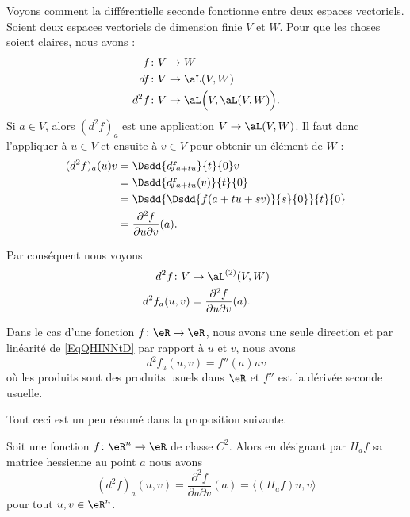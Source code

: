 \begin{example} \label{ExZHZYcNH}
    Voyons comment la différentielle seconde fonctionne entre deux espaces vectoriels. Soient deux espaces vectoriels de dimension finie \( V\) et \( W\). Pour que les choses soient claires, nous avons :
    \begin{subequations}
        \begin{align}
            f&\colon V\to W\\
            df&\colon V\to \aL(V,W)\\
            d^2f&\colon V\to \aL\Big( V,\aL(V,W) \Big).
        \end{align}
    \end{subequations}
    Si \( a\in V\), alors \( (d^2f)_a\) est une application \( V\to \aL(V,W)\). Il faut donc l'appliquer à \( u\in V\) et ensuite à \( v\in V\) pour obtenir un élément de \( W\) :
    \begin{subequations}
        \begin{align}
            (d^2f)_a(u)v&=\Dsdd{ df_{a+tu} }{t}{0}v\\
            &=\Dsdd{ df_{a+tu}(v) }{t}{0}\\
            &=\Dsdd{ \Dsdd{ f(a+tu+sv) }{s}{0} }{t}{0}\\
            &=\frac{ \partial^2f }{ \partial u\partial v }(a).
        \end{align}
    \end{subequations}


    Par conséquent nous voyons
    \begin{equation}\label{EqQHINNtD}
        \begin{aligned}
            d^2f\colon V&\to \aL^{(2)}(V,W) \\
            d^2f_a(u,v)&=\frac{ \partial^2f  }{ \partial u\partial v }(a).
        \end{aligned}
    \end{equation}

    Dans le cas d'une fonction \( f\colon \eR\to \eR\), nous avons une seule direction et par linéarité de \eqref{EqQHINNtD} par rapport à \( u\) et \( v\), nous avons
    \begin{equation}        \label{EQooSOCGooIiNGmG}
        d^2f_a(u,v)=f''(a)uv
    \end{equation}
    où les produits sont des produits usuels dans \( \eR\) et \( f''\) est la dérivée seconde usuelle.
\end{example}

Tout ceci est un peu résumé dans la proposition suivante.
\begin{proposition}     \label{PROPooFWZYooUQwzjW}
    Soit une fonction \( f\colon \eR^n\to \eR\) de classe \( C^2\). Alors en désignant par \( H_af\) sa matrice hessienne au point \( a\) nous avons
    \begin{equation}
        (d^2f)_a(u,v)=\frac{ \partial^2f }{ \partial u\partial v }(a)=\langle (H_af)u, v\rangle
    \end{equation}
    pour tout \( u,v\in \eR^n\).
\end{proposition}

